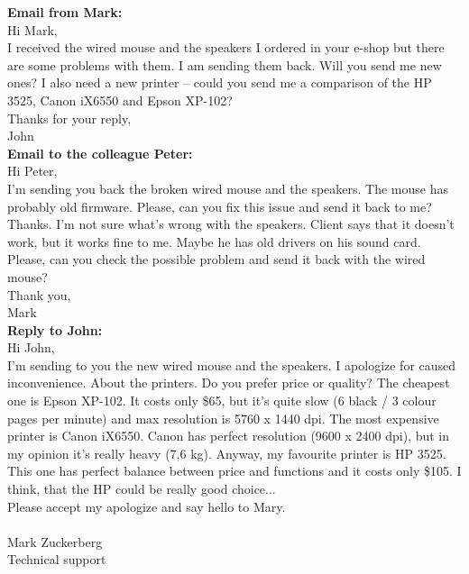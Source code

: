 \documentclass[12pt]{article} %
\begin{document}
\textbf{Email from Mark:}\\
Hi Mark,\\
I received the wired mouse and the speakers I ordered in your e-shop but there are some problems with them. I am sending them back. Will you send me new ones?
I also need a new printer – could you send me a comparison of the HP 3525, Canon iX6550 and Epson XP-102?\\
Thanks for your reply,\\
John\\

\textbf{Email to the colleague Peter:}\\
Hi Peter,\\
I'm sending you back the broken wired mouse and the speakers. The mouse has probably old firmware. Please, can you fix this issue and send it back to me? Thanks. I'm not sure what's wrong with the speakers. Client says that it doesn't work, but it works fine to me. Maybe he has old drivers on his sound card. Please, can you check the possible problem and send it back with the wired mouse?\\
Thank you,\\
Mark\\

\textbf{Reply to John:}\\
Hi John,\\
I'm sending to you the new wired mouse and the speakers. I apologize for caused inconvenience. About the printers. Do you prefer price or quality? The cheapest one is Epson XP-102. It costs only \$65, but it's quite slow (6 black / 3 colour pages per minute) and max resolution is 5760 x 1440 dpi. The most expensive printer is Canon iX6550. Canon has perfect resolution (9600 x 2400 dpi), but in my opinion it's really heavy (7,6 kg). Anyway, my favourite printer is HP 3525. This one has perfect balance between price and functions and it costs only \$105. I think, that the HP could be really good choice...\\
Please accept my apologize and say hello to Mary.\\\\
Mark Zuckerberg\\
Technical support

\end{document}
